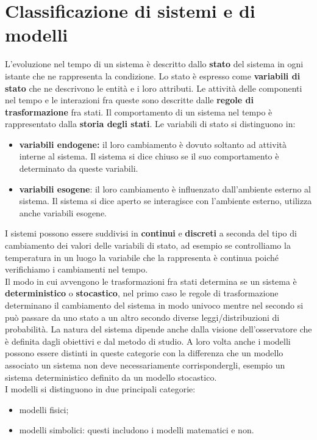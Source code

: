  \section{Classificazione di sistemi e di modelli}
 L'evoluzione nel tempo di un sistema è descritto dallo \textbf{stato} del sistema in ogni istante che ne rappresenta la condizione. Lo stato è espresso come \textbf{variabili di stato} che ne descrivono le entità e i loro attributi. Le attività delle componenti nel tempo e le interazioni fra queste sono descritte dalle \textbf{regole di trasformazione} fra stati. Il comportamento di un sistema nel tempo è rappresentato dalla \textbf{storia degli stati}. Le variabili di stato si distinguono in:
 \begin{itemize}
     \item \textbf{variabili endogene:} il loro cambiamento è dovuto soltanto ad attività interne al sistema. Il sistema si dice chiuso se il suo comportamento è determinato da queste variabili. 
     \item\textbf{ variabili esogene}: il loro cambiamento è influenzato dall'ambiente esterno al sistema. Il sistema si dice aperto se interagisce con l'ambiente esterno, utilizza anche variabili esogene. 
 \end{itemize}
 I sistemi possono essere suddivisi in \textbf{continui} e \textbf{discreti} a seconda del tipo di cambiamento dei valori delle variabili di stato, ad esempio se controlliamo la temperatura in un luogo la variabile che la rappresenta è continua poiché verifichiamo i cambiamenti nel tempo.\\
 Il modo in cui avvengono le trasformazioni fra stati determina se un sistema è \textbf{deterministico} o \textbf{stocastico}, nel primo caso le regole di trasformazione determinano il cambiamento del sistema in modo univoco mentre nel secondo si può passare da uno stato a un altro secondo diverse leggi/distribuzioni di probabilità. La natura del sistema dipende anche dalla visione dell'osservatore che è definita dagli obiettivi e dal metodo di studio. A loro volta anche i modelli possono essere distinti in queste categorie con la differenza che un modello associato un sistema non deve necessariamente corrispondergli, esempio un sistema deterministico definito da un modello stocastico. \\
 I modelli si distinguono in due principali categorie:
 \begin{itemize}
     \item modelli fisici;
     \item modelli simbolici: questi includono i modelli matematici e non.
 \end{itemize}
 
